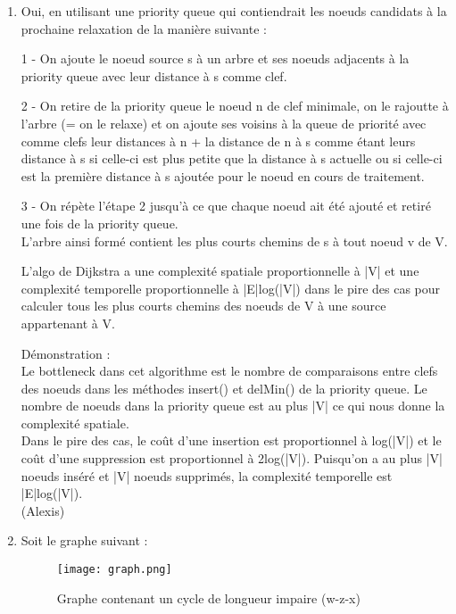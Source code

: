 \documentclass[11pt]{article}
\begin{document}
\begin{enumerate}
\item Oui, en utilisant une priority queue qui contiendrait les noeuds candidats à la prochaine
relaxation de la manière suivante :\\
\par 1 - On ajoute le noeud source s à un arbre et ses noeuds adjacents à la priority 
queue avec leur distance à s comme clef.\\
\par 2 - On retire de la priority queue le noeud n de clef minimale, on le rajoutte
 à l'arbre (= on le relaxe) et on ajoute ses voisins à la queue de priorité avec comme
 clefs leur distances à n + la distance de n à s comme étant leurs distance à s si 
 celle-ci est plus petite que la distance à s actuelle ou si celle-ci est la première
 distance à s ajoutée pour le noeud en cours de traitement.\\
\par 3 - On répète l'étape 2 jusqu'à ce que chaque noeud ait été ajouté et retiré une fois
 de la priority queue.\\
L'arbre ainsi formé contient les plus courts chemins de s à tout noeud v de V.\\
\par L'algo de Dijkstra a une complexité spatiale proportionnelle à |V| et une complexité
 temporelle proportionnelle à |E|log(|V|) dans le pire des cas pour calculer tous les 
 plus courts chemins des noeuds de V à une source appartenant à V.
\par Démonstration :\\
Le bottleneck dans cet algorithme est le nombre de comparaisons entre clefs des noeuds
 dans les méthodes insert() et delMin() de la priority queue. Le nombre de noeuds dans 
 la priority queue est au plus |V| ce qui nous donne la complexité spatiale.\\
 Dans le pire des cas, le coût d'une insertion est proportionnel à log(|V|) et le coût
 d'une suppression est proportionnel à 2log(|V|). Puisqu'on a au plus |V| noeuds inséré
 et |V| noeuds supprimés, la complexité temporelle est |E|log(|V|).\\

(Alexis)\\

\item Soit le graphe suivant :\\

\begin{figure}[h!]
    \center
    \texttt{[image: graph.png]}
    \caption{Graphe contenant un cycle de longueur impaire (w-z-x)}
\end{figure}\\


\end{enumerate}
\end{document}
